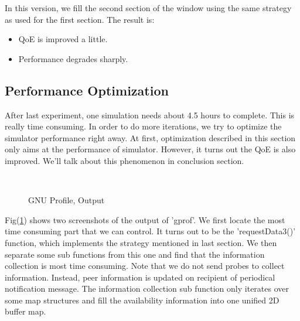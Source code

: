 \documentclass[11pt,a4paper]{article}
\begin{document}
In this version, we fill the second section of the window using 
the same strategy as used for the first section. The result is:
\begin{itemize}
	\item QoE is improved a little. 
	\item Performance degrades sharply. 
\end{itemize}


\subsection{Performance Optimization}
\label{sec:perf}

After last experiment, one simulation needs about 4.5 hours to complete. 
This is really time consuming. In order to do more iterations, we 
try to optimize the simulator performance right away. 
At first, optimization described in this section only aims at 
the performance of simulator. However, it turns out the QoE is 
also improved. We'll talk about this phenomenon in conclusion section. 

\begin{figure}[htb]
\centering
	 \\
	\caption{GNU Profile, Output}
	\label{fig:simu_perf_gprof}
\end{figure}

Fig(\ref{fig:simu_perf_gprof}) shows two screenshots of the 
output of 'gprof'. We first locate the most time consuming part
that we can control. It turns out to be the 'requestData3()' function, 
which implements the strategy mentioned in last section. 
We then separate some sub functions from this one and find that
the information collection is most time consuming. Note that 
we do not send probes to collect information. Instead, peer information
is updated on recipient of periodical notification message. 
The information collection sub function only iterates over some 
map structures and fill the availability information into 
one unified 2D buffer map. 
\end{document}
